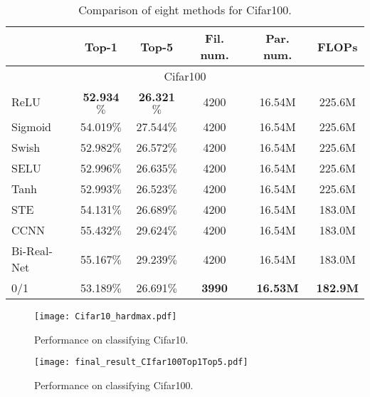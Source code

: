 \documentclass[journal]{IEEEtran}
\begin{document}
   \begin{table}[H] \renewcommand{\arraystretch}{1}\addtolength{\tabcolsep}{0.3pt}
\centering
\caption{{Comparison of eight methods for Cifar100.}}\label{com-9-algs2}
\begin{tabular}{lccccc}\hline
{~} & Top-1 & Top-5 & {Fil.  num.} & {Par. num.}& {FLOPs}\\ \hline
\multicolumn{6}{c}{Cifar100}\\\hline
ReLU   &{\bf 52.934$\%$}  & {\bf 26.321$\%$}   &  4200 & 16.54M & 225.6M\\
Sigmoid   & 54.019$\%$  & 27.544$\%$&  4200 & 16.54M  & 225.6M\\
Swish      & 52.982$\%$  & 26.572$\%$& 4200 & 16.54M  & 225.6M\\
SELU          &52.996$\%$  & 26.635$\%$& 4200 & 16.54M & 225.6M\\
Tanh         &52.993$\%$  & 26.523$\%$ & 4200 & 16.54M &225.6M\\
STE         &54.131$\%$  & 26.689$\%$ & 4200 & 16.54M & 183.0M\\
CCNN         &55.432$\%$  & 29.624$\%$ & 4200 & 16.54M & 183.0M\\
Bi-Real-Net     &55.167$\%$  & 29.239$\%$ & 4200 & 16.54M & 183.0M\\
0/1 & 53.189$\%$  & 26.691$\%$   &  {\bf 3990}  & {\bf 16.53M} & {\bf 182.9M}\\\hline
\end{tabular}
\end{table}

\begin{figure*}[!th]
\centering
\texttt{[image: Cifar10\_hardmax.pdf]}\vspace{-2mm}
\caption{Performance on classifying  Cifar10.}
\label{fig:Cifar10}
\end{figure*}


\begin{figure*}[!th]
\centering
\texttt{[image: final\_result\_CIfar100Top1Top5.pdf]}
\vspace{-5mm}
\caption{Performance on classifying Cifar100.}
\label{fig:Cifar100Top5}\vspace{-2mm}
\end{figure*}
\end{document}

